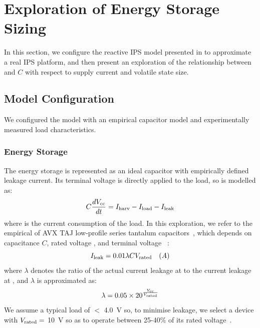 \section{Exploration of Energy Storage Sizing} \label{sec:c3_exploration}


In this section, we configure the reactive IPS model presented in  to approximate a real IPS platform, and then present an exploration of the relationship between  and $C$ with respect to supply current  and volatile state size.

\subsection{Model Configuration}

We configured the model with an empirical capacitor model and experimentally measured load characteristics. 

\subsubsection{Energy Storage}

The energy storage is represented as an ideal capacitor with empirically defined leakage current. 
Its terminal voltage is directly applied to the load, so is modelled as:
\begin{equation}
  C \frac{dV_{\text{cc}}}{dt} = I_{\text{harv}} - I_{\text{load}} - I_{\text{leak}}
\end{equation}
where  is the current consumption of the load. 
In this exploration, we refer to the empirical  of AVX TAJ low-profile series tantalum capacitors~\cite{tancap1}, which depends on capacitance $C$, rated voltage , and terminal voltage ~\cite{avxleakage}:
\begin{equation}
    I_{\text{leak}} = 0.01 \lambda C V_{\text{rated}} \quad (A)
\end{equation}
where $\lambda$ denotes the ratio of the actual current leakage at  to the current leakage at , and $\lambda$ is approximated as: 
\begin{equation}
    \lambda = 0.05 \times 20^{\frac{V_{\text{cc}}}{V_{\text{rated}}}}
\end{equation}
We assume a typical load of $<$ \SI{4.0}{\volt} so, to minimise leakage, we select a device with $V_{\text{rated}} =$ \SI{10}{\volt} so as to operate between 25-40\% of its rated voltage~\cite{avxleakage}. 


